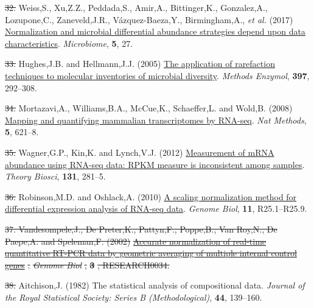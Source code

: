 \documentclass[
]{article}
\newlength{\cslhangindent}
\newenvironment{CSLReferences}[2] %
 {\begin{list}{}{%
  \setlength{\itemindent}{0pt}
  \setlength{\leftmargin}{0pt}
  \setlength{\parsep}{0pt}
  \ifodd #1
   \setlength{\leftmargin}{\cslhangindent}
   \setlength{\itemindent}{-1\cslhangindent}
  \fi
  \setlength{\itemsep}{#2\baselineskip}}}
 {\end{list}}
\providecommand{\DIFadd}[1]{{\protect\color{blue}\uwave{#1}}} %
\providecommand{\DIFdel}[1]{{\protect\color{red}\sout{#1}}}                      %
\providecommand{\DIFaddbegin}{} %
\providecommand{\DIFaddend}{} %
\providecommand{\DIFdelbegin}{} %
\providecommand{\DIFdelend}{} %
\newcommand{\DIFscaledelfig}{0.5}
\newlength{\DIFdelgraphicswidth} %
\newlength{\DIFdelgraphicsheight} %
\newcommand{\DIFaddincludegraphics}[2][]{{\color{blue}\fbox{\DIFOincludegraphics[#1]{#2}}}} %
\newcommand{\DIFdelincludegraphics}[2][]{%
\sbox{\DIFdelgraphicsbox}{\DIFOincludegraphics[#1]{#2}}%
\settoboxwidth{\DIFdelgraphicswidth}{\DIFdelgraphicsbox} %
\settoboxtotalheight{\DIFdelgraphicsheight}{\DIFdelgraphicsbox} %
\scalebox{\DIFscaledelfig}{%
\parbox[b]{\DIFdelgraphicswidth}{\usebox{\DIFdelgraphicsbox}\\[-\baselineskip] \rule{\DIFdelgraphicswidth}{0em}}\llap{\resizebox{\DIFdelgraphicswidth}{\DIFdelgraphicsheight}{%
\setlength{\unitlength}{\DIFdelgraphicswidth}%
\begin{picture}(1,1)%
\thicklines\linethickness{2pt} %
{\color[rgb]{1,0,0}\put(0,0){\framebox(1,1){}}}%
{\color[rgb]{1,0,0}\put(0,0){\line( 1,1){1}}}%
{\color[rgb]{1,0,0}\put(0,1){\line(1,-1){1}}}%
\end{picture}%
}\hspace*{3pt}}} %
} %
\DeclareRobustCommand{\DIFaddbegin}{\DIFOaddbegin \let\includegraphics\DIFaddincludegraphics} %
\DeclareRobustCommand{\DIFaddend}{\DIFOaddend \let\includegraphics\DIFOincludegraphics} %
\DeclareRobustCommand{\DIFdelbegin}{\DIFOdelbegin \let\includegraphics\DIFdelincludegraphics} %
\DeclareRobustCommand{\DIFdelend}{\DIFOaddend \let\includegraphics\DIFOincludegraphics} %
\begin{document}
\begin{CSLReferences}{1}{1}
\DIFdelbegin \DIFdel{32. }\DIFdelend \DIFaddbegin \DIFadd{31. }\DIFaddend Weiss,S., Xu,Z.Z., Peddada,S., Amir,A., Bittinger,K., Gonzalez,A.,
Lozupone,C., Zaneveld,J.R., Vázquez-Baeza,Y., Birmingham,A., \emph{et
al.} (2017)
\href{https://doi.org/10.1186/s40168-017-0237-y}{Normalization and
microbial differential abundance strategies depend upon data
characteristics}. \emph{Microbiome}, \textbf{5}, 27.

\DIFdelbegin \DIFdel{33. }\DIFdelend \DIFaddbegin \DIFadd{32. }\DIFaddend Hughes,J.B. and Hellmann,J.J. (2005)
\href{https://doi.org/10.1016/S0076-6879(05)97017-1}{The application of
rarefaction techniques to molecular inventories of microbial diversity}.
\emph{Methods Enzymol}, \textbf{397}, 292--308.

\DIFdelbegin \DIFdel{34. }\DIFdelend \DIFaddbegin \DIFadd{33. }\DIFaddend Mortazavi,A., Williams,B.A., McCue,K., Schaeffer,L. and Wold,B.
(2008) \href{https://doi.org/10.1038/nmeth.1226}{Mapping and quantifying
mammalian transcriptomes by {RNA-seq}}. \emph{Nat Methods}, \textbf{5},
621--8.

\DIFdelbegin \DIFdel{35. }\DIFdelend \DIFaddbegin \DIFadd{34. }\DIFaddend Wagner,G.P., Kin,K. and Lynch,V.J. (2012)
\href{https://doi.org/10.1007/s12064-012-0162-3}{Measurement of mRNA
abundance using RNA-seq data: RPKM measure is inconsistent among
samples}. \emph{Theory Biosci}, \textbf{131}, 281--5.

\DIFdelbegin \DIFdel{36. }\DIFdelend \DIFaddbegin \DIFadd{35. }\DIFaddend Robinson,M.D. and Oshlack,A. (2010)
\href{https://doi.org/10.1186/gb-2010-11-3-r25}{A scaling normalization
method for differential expression analysis of {RNA-seq} data}.
\emph{Genome Biol}, \textbf{11}, R25.1--R25.9.

\DIFdelbegin {}
\DIFdel{37. Vandesompele,J., De Preter,K., Pattyn,F., Poppe,B., Van Roy,N., De
Paepe,A. and Speleman,F. (2002)
}\href{https://www.ncbi.nlm.nih.gov/pubmed/12184808}{\DIFdel{Accurate
normalization of real-time quantitative RT-PCR data by geometric
averaging of multiple internal control genes}}%
\DIFdel{. }\emph{\DIFdel{Genome Biol}}%
\DIFdel{,
}\textbf{\DIFdel{3}}%
\DIFdel{, RESEARCH0034.
}%

\DIFdelend {}
\DIFdelbegin \DIFdel{38. }\DIFdelend \DIFaddbegin \DIFadd{36. }\DIFaddend Aitchison,J. (1982) The statistical analysis of compositional data.
\emph{Journal of the Royal Statistical Society: Series B
(Methodological)}, \textbf{44}, 139--160.


\end{CSLReferences}
\end{document}
